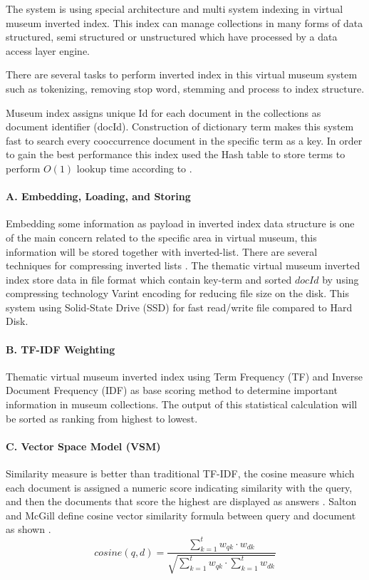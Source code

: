 The system is using special architecture and multi system indexing in virtual museum inverted index. This index can manage collections in many forms of data structured, semi structured or unstructured which have processed by a data access layer engine.

There are several tasks to perform inverted index in this virtual museum system such as tokenizing, removing stop word, stemming and process to index structure.

Museum index assigns unique Id for each document in the collections as document identifier (docId). Construction of dictionary term makes this system fast to search every cooccurrence document in the specific term as a key. In order to gain the best performance this index used the Hash table to store terms to perform \(O(1)\) lookup time according to \cite{CuttingPedersen}.

\paragraph{A. Embedding, Loading, and Storing}
Embedding some information as payload in inverted index data structure is one of the main concern related to the specific area in virtual museum, this information will be stored together with inverted-list. There are several techniques for compressing inverted lists \cite{ManningRaghavanSchutze,MoffatZobel}. The thematic virtual museum inverted index store data in file format which contain key-term and sorted \(\textit{docId}\) by using compressing technology Varint encoding \cite{LemireBoytsov} for reducing file size on the disk. This system using Solid-State Drive (SSD) for fast read/write file compared to Hard Disk.

\paragraph{B. TF-IDF Weighting}
Thematic virtual museum inverted index using Term Frequency (TF) and Inverse Document Frequency (IDF) \cite{ManningRaghavanSchutze} as base scoring method to determine important information in museum collections. The output of this statistical calculation will be sorted as ranking from highest to lowest.

\paragraph{C. Vector Space Model (VSM)}
Similarity measure is better than traditional TF-IDF, the cosine measure which each document is assigned a numeric score indicating similarity with the query, and then the documents that score the highest are displayed as answers \cite{MoffatZobel}. Salton and McGill define cosine vector similarity formula between query and document as shown \cite{SaltonBuckley}.
\[
\textit{cosine}(q, d) = \frac{\sum_{k=1}^{t} w_{qk} \cdot w_{dk}}{\sqrt{\sum_{k=1}^{t} w_{qk} \cdot \sum_{k=1}^{t} w_{dk}}}
\]

